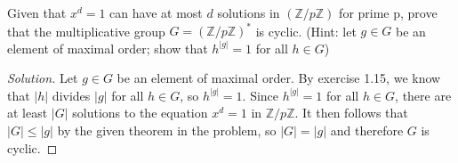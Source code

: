 \documentclass[12pt]{article}
\newenvironment{problem}[2][Problem]{\begin{trivlist}
\item[\hskip \labelsep {\bfseries #1}\hskip \labelsep {\bfseries #2.}]}{\end{trivlist}}
\newenvironment{solution}
  {\renewcommand\qedsymbol{$\blacksquare$}\begin{proof}[Solution]}
{\end{proof}}
\begin{document}
\begin{problem}{4.11}
  Given that $x^d=1$ can have at most $d$ solutions in $(\mathbb{Z}/p\mathbb{Z})$ for prime p,
    prove that the multiplicative group $G=(\mathbb{Z}/p\mathbb{Z})^*$ is cyclic.
    (Hint: let $g\in G$ be an element of maximal order; show that $h^{|g|}=1$ for all $h\in G$)
\end{problem}
\begin{solution}
    Let $g\in G$ be an element of maximal order.
    By exercise 1.15, we know that $|h|$ divides $|g|$ for all $h\in G$, so $h^{|g|}=1$.
    Since $h^{|g|}=1$ for all $h\in G$, there are at least $|G|$ solutions to the equation
    $x^d=1$ in $\mathbb{Z}/p\mathbb{Z}$. It then follows that $|G|\leq|g|$ by the given theorem in the problem,
    so $|G| = |g|$ and therefore $G$ is cyclic.
\end{solution}
\end{document}
